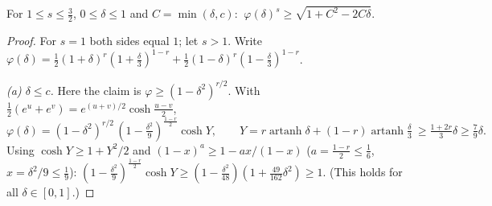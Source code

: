 \documentclass[11pt]{article}
\theoremstyle{remark}\newtheorem{remark}[theorem]{Remark}
\begin{document}
\begin{lemma}\label{one}
For $1\le s\le\frac32$, $0\le\delta\le1$ and $C=\min(\delta,c)$: $\ \varphi(\delta)^s\ge\sqrt{1+C^2-2C\delta}$.
\end{lemma}
\begin{proof}
For $s=1$ both sides equal $1$; let $s>1$.  Write $\varphi(\delta)=\frac12(1+\delta)^r(1+\frac\delta3)^{1-r}+\frac12(1-\delta)^r(1-\frac\delta3)^{1-r}$.

\emph{(a) $\delta\le c$.}  Here the claim is $\varphi\ge(1-\delta^2)^{r/2}$.  With $\frac12(e^u+e^v)=e^{(u+v)/2}\cosh\frac{u-v}2$,
\[\varphi(\delta)=(1-\delta^2)^{r/2}\,(1-\tfrac{\delta^2}9)^{\frac{1-r}2}\cosh Y,\qquad Y=r\operatorname{artanh}\delta+(1-r)\operatorname{artanh}\tfrac\delta3\ \ge\tfrac{1+2r}3\delta\ge\tfrac79\delta .\]
Using $\cosh Y\ge1+Y^2/2$ and $(1-x)^a\ge1-ax/(1-x)$ ($a=\frac{1-r}2\le\frac16$, $x=\delta^2/9\le\frac19$):
$(1-\frac{\delta^2}9)^{\frac{1-r}2}\cosh Y\ge(1-\frac{\delta^2}{48})(1+\frac{49}{162}\delta^2)\ge1$.  (This holds for all $\delta\in[0,1]$.)


\end{proof}
\end{document}
